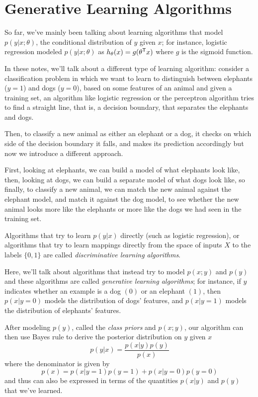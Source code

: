 \chapter{Generative Learning Algorithms}
So far, we’ve mainly been talking about learning algorithms that model $p(y | x; \theta)$, 
the conditional distribution of $y$ given $x$; for instance, logistic regression modeled $p(y | x; \theta)$ as
$h_{\theta}(x) = g(\theta ^ \mathsf{T}x)$ where $g$ is the sigmoid function.

In these notes, we’ll talk about a different type of learning algorithm: consider a classification problem
in which we want to learn to distinguish between elephants ($y = 1$) and dogs ($y = 0$), based on some features
of an animal and given a training set, an algorithm like logistic regression or the perceptron algorithm
tries to find a straight line, that is, a decision boundary, that separates the elephants and dogs.

Then, to classify a new animal as either an elephant or a dog, it checks on which side of the decision boundary
it falls, and makes its prediction accordingly but now we introduce a different approach.

First, looking at elephants, we can build a model of what elephants look like, then, looking at dogs,
we can build a separate model of what dogs look like, so finally, to classify a new animal,
we can match the new animal against the elephant model, and match it against the dog model, 
to see whether the new animal looks more like the elephants or more like the dogs we had seen in the training set.

Algorithms that try to learn $p(y | x)$ directly (such as logistic regression), or algorithms that try to learn 
mappings directly from the space of inputs $X$ to the labels $\{0, 1\}$
are called \emph{discriminative learning algorithms}.

Here, we’ll talk about algorithms that instead try to model $p(x; y)$ and $p(y)$ and these algorithms
are called \emph{generative learning algorithms}; for instance, if $y$ indicates whether an example is
a dog $(0)$ or an elephant $(1)$, then $p(x | y = 0)$ models the distribution of dogs’ features, and 
$p(x | y = 1)$ models the distribution of elephants’ features.

After modeling $p(y)$, called the \emph{class priors} and $p(x; y)$, our algorithm can then use Bayes rule
to derive the posterior distribution on $y$ given $x$
\[ p(y | x) = \frac{p(x | y)p(y)}{p(x)} \]
where the denominator is given by 
\[ p(x) = p(x | y = 1)p(y = 1) + p(x | y = 0)p(y = 0) \] 
and thus can also be expressed in terms of the quantities $p(x |y)$ and $p(y)$ that we’ve learned.

